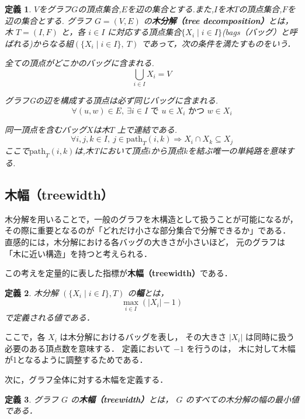 \documentclass[paper]{ieicej}
\newtheorem{definition}{定義}
\begin{document}
\begin{definition}
$V$をグラフ$G$の頂点集合,$E$を辺の集合とする.また,$I$を木$T$の頂点集合,$F$を辺の集合とする.
グラフ $G = (V, E)$ の\textbf{木分解（tree decomposition）}とは，
木 $T = (I, F)$ と，各 $i \in I$ に対応する頂点集合$\{ X_i \mid i \in I \}$\it(bags（バッグ）と呼ばれる)からなる組$(\{X_i \mid i \in I\},\ T)$
であって，次の条件を満たすものをいう．

\item[(TD1)] 全ての頂点がどこかのバッグに含まれる.
  \[
    \bigcup_{i \in I} X_i = V
  \]

      
  
  \item[(TD2)] グラフGの辺を構成する頂点は必ず同じバッグに含まれる.
 \[
  \forall (u,w) \in E,\ \exists i \in I \text{ で } u \in X_i \text{ かつ } w \in X_i
\]
    

  \item[(TD3)] 同一頂点を含むバッグ$X$は木$T$ 上で連結である.
  \[
  \forall i,j,k \in I,\ 
  j \in \mathrm{path}_T(i,k)
  \Rightarrow
  X_i \cap X_k \subseteq X_j
\]
ここで$\mathrm{path}_T(i,k)$は,木Tにおいて頂点$i$から頂点$k$を結ぶ唯一の単純路を意味する.    
  \end{definition}


\subsection{木幅（treewidth）}

木分解を用いることで，一般のグラフを木構造として扱うことが可能になるが，
その際に重要となるのが「どれだけ小さな部分集合で分解できるか」である．
直感的には，木分解における各バッグの大きさが小さいほど，
元のグラフは「木に近い構造」を持つと考えられる．

この考えを定量的に表した指標が\textbf{木幅（treewidth）}である．

\begin{definition}
木分解 $(\{X_i \mid i \in I\}, T)$ の\textbf{幅}とは，
\[
\max_{i \in I} (|X_i| - 1)
\]
で定義される値である．
\end{definition}

ここで，各 $X_i$ は木分解におけるバッグを表し，
その大きさ $|X_i|$ は同時に扱う必要のある頂点数を意味する．
定義において $-1$ を行うのは，
木に対して木幅が1となるように調整するためである．

次に，グラフ全体に対する木幅を定義する．

\begin{definition}
グラフ $G$ の\textbf{木幅（treewidth）}とは，
$G$ のすべての木分解の幅の最小値である．
\end{definition}
\end{document}
